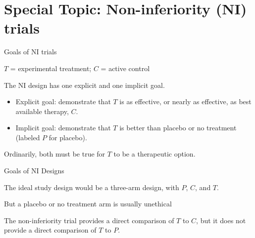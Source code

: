 \documentclass[ignorenonframetext,]{beamer}
\providecommand{\tightlist}{%
  \setlength{\itemsep}{0pt}\setlength{\parskip}{0pt}}
\begin{document}
\hypertarget{special-topic-non-inferiority-ni-trials}{%
\section{Special Topic: Non-inferiority (NI)
trials}\label{special-topic-non-inferiority-ni-trials}}

\begin{frame}{Goals of NI trials}
\protect\hypertarget{goals-of-ni-trials}{}

\(T\) = experimental treatment; \(C\) = active control

The NI design has one explicit and one implicit goal.

\begin{itemize}
\tightlist
\item
  Explicit goal: demonstrate that \(T\) is as effective, or nearly as
  effective, as best available therapy, \(C\).\\
\item
  Implicit goal: demonstrate that \(T\) is better than placebo or no
  treatment (labeled \(P\) for placebo).
\end{itemize}

Ordinarily, both must be true for \(T\) to be a therapeutic option.

\end{frame}

\begin{frame}{Goals of NI Designs}
\protect\hypertarget{goals-of-ni-designs}{}

The ideal study design would be a three-arm design, with \(P\), \(C\),
and \(T\).

But a placebo or no treatment arm is usually unethical

The non-inferiority trial provides a direct comparison of \(T\) to
\(C\), but it does not provide a direct comparison of \(T\) to \(P\).

\end{frame}
\end{document}
